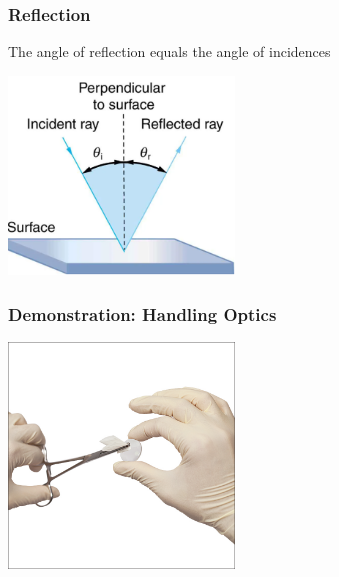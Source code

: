 \documentclass{beamer}
\begin{document}
\begin{frame}\frametitle{Reflection}
The angle of reflection equals the angle of incidences

\begin{center}
\includegraphics[width=6cm]{fig/reflect.png}
\end{center}

\end{frame}

\begin{frame}\frametitle{Demonstration: Handling Optics}
\begin{center}
\includegraphics[width=6cm]{fig/opticscleaning.jpg}
\end{center}
\end{frame}
\end{document}

